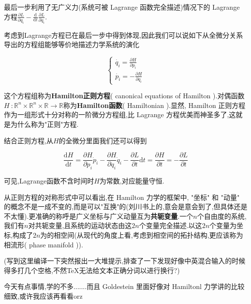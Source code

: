 \documentclass[UTF8]{article}
\newcommand{\D}{\mathrm{d}}
\begin{document}
	最后一步利用了无广义力(系统可被 Lagrange 函数完全描述)情况下的 Lagrange 方程$\frac{\partial L}{\partial q_{i}} - \frac{\D}{\D t}\frac{\partial L}{\partial \dot{q}_{i}}$.
	
	考虑到Lagrange方程已在最后一步中得到体现,因此我们可以说如下从全微分关系导出的方程组能够等价地描述力学系统的演化
	
	\[\begin{cases}
		\dot{q_{i}} = \frac{\partial H}{\partial p_{i}}\\
		\dot{p_{i}} = -\frac{\partial H}{\partial q_{i}}
	\end{cases}\]
	
	这个方程组称为\textbf{Hamilton正则方程}( canonical equations of Hamilton ).对偶函数$H~: \mathbb{R}^n \times \mathbb{R}^n \times \mathbb{R} \to \mathbb{R}$称为\textbf{Hamilton函数}( Hamiltonian ).显然, Hamilton 正则方程作为一组形式十分对称的一阶微分方程组,比 Lagrange 方程优美而神圣多了,这就是为什么称为"正则"方程.
	
	结合正则方程,从$H$的全微分里面我们还可以得到
	
	\[\frac{\D H}{\D t} = \frac{\partial H}{\partial p_{i}} \dot{p}_{i} - \frac{\partial H}{\partial q_{i}} \dot{q}_{i} - \frac{\partial L}{\partial t} \D t = \frac{\partial H}{\partial t}= - \frac{\partial L}{\partial t}\]
	
	可见,Lagrange函数不含时间时$H$为常数,对应能量守恒.
	
	从正则方程的对称形式中可以看出,在 Hamilton 力学的框架中, "坐标" 和 "动量" 的概念不是一成不变的,而是可以"互换"的(刘川书上的,意会是意会到了,但具体还是不太懂).更准确的称呼是广义坐标与广义动量互为\textbf{共轭变量}.一个$n$个自由度的系统,我们有$n$对共轭变量,且系统的运动状态由这$2n$个变量完全描述.以这$2n$个变量为坐标,构成了$2n$为的相空间(从现代的角度上看,考虑到相空间的拓扑结构,更应该称为相流形( phase manifold )).
	
	(写到这里编译一下突然报出一大堆提示,排查了一下发现好像中英混合输入的时候得多打几个空格,不然TeX无法给文本正确分词以进行换行?)
	
	今天有点事情,学的不多.......而且 Goldestein\cite{Goldestin} 里面好像对 Hamiltonl 力学讲的比较细致,或许我应该再看看orz
	
	
	
	
	\newpage
	
\end{document}
